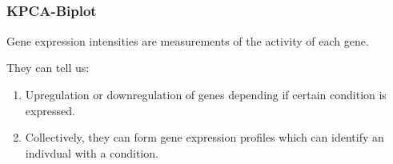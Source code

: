 \documentclass[serif ]{beamer}
\begin{document}
\begin{frame}
\begin{equation}
\begin{matrix}
			\end{matrix}
			\end{equation}

	

	\end{frame}

	\begin{frame}
		\frametitle{KPCA-Biplot}
			Gene expression intensities  are measurements of the activity of each gene.\newline
			
			They can tell us:
			
			\begin{enumerate}
				\item Upregulation or downregulation of genes depending if certain condition is
				         expressed.
				\item Collectively, they can form gene expression profiles which can identify an
				         indivdual with a condition.
			\end{enumerate}
	\end{frame}
\end{document}
